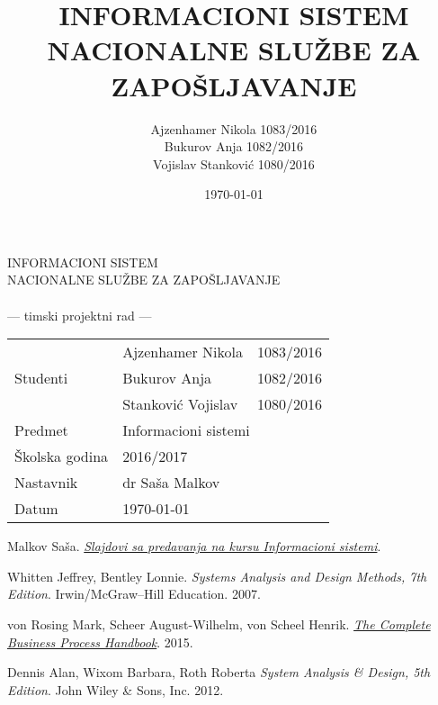 \documentclass[a4paper, 12pt]{article}
\author{Ajzenhamer Nikola 1083/2016\\Bukurov Anja 1082/2016\\Vojislav Stankovi\'c 1080/2016}
\title{INFORMACIONI SISTEM NACIONALNE SLU\v ZBE ZA ZAPO\v SLJAVANJE}
\date{\today}
\begin{document}
\begin{titlepage}
	\centering
	
	\vspace{0.3\textheight}
	
	{\Huge INFORMACIONI SISTEM\\NACIONALNE SLU\v ZBE ZA ZAPO\v SLJAVANJE}
	\\~
	\\
	{\Large — timski projektni rad —}
	
	\vfill
	
	{
		\Large 
		\begin{tabular}{|l|l|l|}
			\hline
			\multirow{3}{*}{Studenti} & Ajzenhamer Nikola     & 1083/2016\\ \cline{2-3}
			                          & Bukurov Anja          & 1082/2016\\ \cline{2-3}
			                          & Stankovi\' c Vojislav & 1080/2016\\
			\hline
			Predmet                   & \multicolumn{2}{l|}{Informacioni sistemi}\\
			\hline
			\v Skolska godina         & \multicolumn{2}{l|}{2016/2017}\\
			\hline
			Nastavnik                 & \multicolumn{2}{l|}{dr Sa\v sa Malkov}\\
			\hline
			Datum                     & \multicolumn{2}{l|}{\today}\\
			\hline
		\end{tabular}
	}
\end{titlepage}
\newpage
\tableofcontents
\newpage









\thispagestyle{empty}
\begin{thebibliography}{9}
	
	Malkov Sa\v sa.
	\href{http://poincare.matf.bg.ac.rs/~smalkov/nastava.master.html\#r271\_is}{\textit{Slajdovi sa predavanja na kursu Informacioni sistemi}}.
	
	Whitten Jeffrey, Bentley Lonnie.
	\textit{Systems Analysis and Design Methods, 7th Edition}.
	Irwin/McGraw--Hill Education.
	2007.
	
	von Rosing Mark, Scheer August-Wilhelm, von Scheel Henrik.
	\href{http://www.omg.org/news/whitepapers/Business_Process_Model_and_Notation.pdf}{\textit{The Complete Business Process Handbook}}.
	2015.
	
	Dennis Alan, Wixom Barbara, Roth Roberta
	\textit{System Analysis \& Design, 5th Edition}.
	John Wiley \& Sons, Inc.
	2012.
	
\end{thebibliography}
\end{document}

